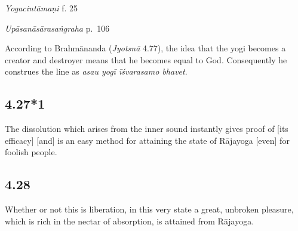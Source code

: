 \begin{ekdosis}
\begin{testimonia}[hp04_027]
\emph{Yogacintāmaṇi} f. 25
\begin{versinnote}
\end{versinnote}

\emph{Upāsanāsārasaṅgraha} p.~106
\begin{versinnote}
\end{versinnote}

\end{testimonia}

\begin{philcomm}[hp04_027]

According to Brahmānanda (\emph{Jyotsnā} 4.77), the idea that the yogi becomes a creator and destroyer means that he becomes equal to God. Consequently he construes the line as \emph{asau yogī īśvarasamo bhavet}.
\end{philcomm}

\subsection*{4.27*1}
\begin{translation}[hp04_027_1]
The dissolution which arises from the inner sound  instantly gives proof of [its efficacy] [and] is an easy method for attaining the state of Rājayoga [even] for foolish people.
\end{translation}




\subsection*{4.28}
\begin{translation}[hp04_028]
Whether or not this is liberation, in this very state a great, unbroken pleasure, which is rich in the nectar of absorption, is attained from Rājayoga.
\end{translation}


\end{ekdosis}
